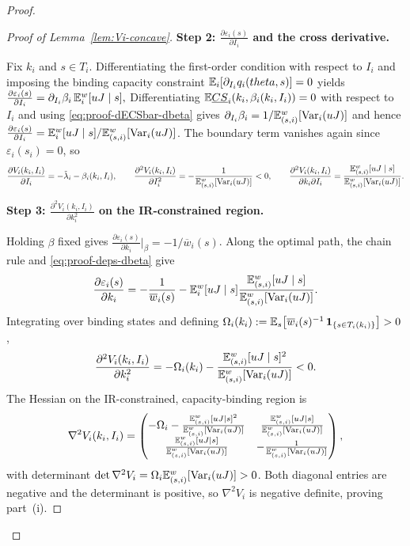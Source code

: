 \documentclass{class}
\begin{document}
\begin{proof}
\begin{proof}[Proof of Lemma~\ref{lem:Vi-concave}]
\noindent\textbf{Step 2: \(\frac{\partial \varepsilon_i(s)}{\partial I_i}\) and the cross derivative.}

Fix $k_i$ and $s\in T_i$. Differentiating the first-order condition with respect to $I_i$ and imposing the binding capacity constraint $\mathbb{E}_i[\partial_{I_i}q_i(theta,s)]=0$ yields
$\frac{\partial \varepsilon_i(s)}{\partial I_i} = \partial_{I_i}\beta_i\, \mathbb{E}_i^w[uJ\mid s],$
Differentiating $\mathbb{E} \underline{CS}_i(k_i,\beta_i(k_i,I_i))=0$ with respect to $I_i$ and using \ref{eq:proof-dECSbar-dbeta} gives $\partial_{I_i}\beta_i=1/\mathbb{E}_{(s,i)}^w[\mathrm{Var}_i(uJ)]$ and hence $\frac{\partial \varepsilon_i(s)}{\partial I_i}= \mathbb{E}_i^w[uJ\mid s]/\mathbb{E}_{(s,i)}^w[\mathrm{Var}_i(uJ)]$. The boundary term vanishes again since $\varepsilon_i(s_i)=0$, so
\begin{equation}\label{eq:proof-Vi-Iderivs}
\frac{\partial V_i(k_i,I_i)}{\partial  I_i}= -\tilde\lambda_i-\beta_i(k_i,I_i), \qquad
\frac{\partial^2 V_i(k_i,I_i)}{\partial  I_i^2}= -\frac{1}{\mathbb{E}_{(s,i)}^w[\mathrm{Var}_i(uJ)]}<0, \qquad
\frac{\partial^2 V_i(k_i,I_i)}{\partial  k_i\partial  I_i} = \frac{\mathbb{E}_{(s,i)}^w[uJ\mid s]}{\mathbb{E}_{(s,i)}^w[\mathrm{Var}_i(uJ)]}.
\end{equation}


\noindent\textbf{Step 3: \(\frac{\partial^2 V_i(k_i,I_i)}{\partial  k_i^2}\) on the IR-constrained region.}

Holding $\beta$ fixed gives $\frac{\partial \varepsilon_i(s)}{\partial k_i}|_\beta = -1/\overline w_i(s)$. Along the optimal path, the chain rule and \ref{eq:proof-deps-dbeta} give
\[
\frac{\partial \varepsilon_i(s)}{\partial k_i} = -\frac{1}{\overline w_i(s)} -  \mathbb{E}_i^w[uJ\mid s]\frac{\mathbb{E}_{(s,i)}^w[uJ\mid s]}{\mathbb{E}_{(s,i)}^w[\mathrm{Var}_i(uJ)]}.
\]
Integrating over binding states and defining $\Omega_i(k_i):=\mathbb{E}_s\!\left[\overline w_i(s)^{-1}\,\mathbf{1}_{\{s\in T_i(k_i)\}}\right]>0$,
\begin{equation}\label{eq:proof-Vi-kk}
\frac{\partial^2 V_i(k_i,I_i)}{\partial  k_i^2} = -\Omega_i(k_i)-\frac{\mathbb{E}_{(s,i)}^w[uJ\mid s]^2}{\mathbb{E}_{(s,i)}^w[\mathrm{Var}_i(uJ)]}<0.
\end{equation}
The Hessian on the IR-constrained, capacity-binding region is
\[
\nabla^2 V_i(k_i,I_i) = \begin{pmatrix} -\Omega_i-\frac{\mathbb{E}_{(s,i)}^w[uJ\mid s]^2}{\mathbb{E}_{(s,i)}^w[\mathrm{Var}_i(uJ)]} & \frac{\mathbb{E}_{(s,i)}^w[uJ\mid s]}{\mathbb{E}_{(s,i)}^w[\mathrm{Var}_i(uJ)]} \\[0.4em] \frac{\mathbb{E}_{(s,i)}^w[uJ\mid s]}{\mathbb{E}_{(s,i)}^w[\mathrm{Var}_i(uJ)]} & -\frac{1}{\mathbb{E}_{(s,i)}^w[\mathrm{Var}_i(uJ)]} \end{pmatrix},
\]
with determinant $\det\nabla^2 V_i = \Omega_i\mathbb{E}_{(s,i)}^w[\mathrm{Var}_i(uJ)] > 0$. Both diagonal entries are negative and the determinant is positive, so $\nabla^2 V_i$ is negative definite, proving part~(i).



\end{proof}
\end{proof}
\end{document}
